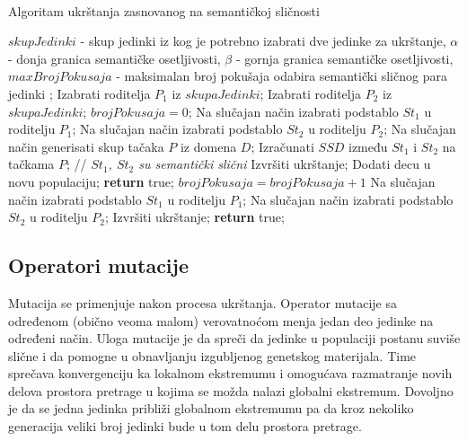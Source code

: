 \documentclass[main.tex]{subfiles}
\begin{document}
\\

\begin{algorithm}
\caption{Algoritam ukrštanja zasnovanog na semantičkoj sličnosti}
\label{alg:ssc}
  \begin{algorithmic}[1]
    \INPUT $skupJedinki$ - skup jedinki iz kog je potrebno izabrati dve jedinke za ukrštanje, $\alpha$ - donja granica semantičke osetljivosti, $\beta$ - gornja granica semantičke osetljivosti, $maxBrojPokusaja$ - maksimalan broj pokušaja odabira semantički sličnog para jedinki
    \OUTPUT;
    \STATE Izabrati roditelja $P_1$ iz $skupaJedinki$;
    \STATE Izabrati roditelja $P_2$ iz $skupaJedinki$;
    \STATE $brojPokusaja = 0$;
      \STATE Na slučajan način izabrati podstablo $St_1$ u roditelju $P_1$;
      \STATE Na slučajan način izabrati podstablo $St_2$ u roditelju $P_2$;
      \STATE Na slučajan način generisati skup tačaka $P$ iz domena $D$;
      \STATE Izračunati $SSD$ između $St_1$ i $St_2$ na tačkama $P$;
        \STATE \color{gray}// \textit{$St_1$, $St_2$ su semantički slični}
        \STATE \color{black}Izvršiti ukrštanje;
        \STATE Dodati decu u novu populaciju;
        \STATE \textbf{return} true;
      \ENDIF
      \STATE $brojPokusaja = brojPokusaja + 1$
    \ENDWHILE
        \STATE Na slučajan način izabrati podstablo $St_1$ u roditelju $P_1$;
        \STATE Na slučajan način izabrati podstablo $St_2$ u roditelju $P_2$;
        \STATE Izvršiti ukrštanje;
        \STATE \textbf{return} true;
      \ENDIF
  \end{algorithmic}
\end{algorithm}



\subsection{Operatori mutacije}
\label{sec:mutation}

Mutacija se primenjuje nakon procesa ukrštanja. Operator mutacije sa određenom (obično veoma malom) verovatnoćom menja jedan deo jedinke na određeni način. Uloga mutacije je da spreči da jedinke u populaciji postanu suviše slične i da pomogne u obnavljanju izgubljenog genetskog materijala. Time sprečava konvergenciju ka lokalnom ekstremumu i omogućava razmatranje novih delova prostora pretrage u kojima se možda nalazi globalni ekstremum. Dovoljno je da se jedna jedinka približi globalnom ekstremumu pa da kroz nekoliko generacija veliki broj jedinki bude u tom delu prostora pretrage.
\end{document}
